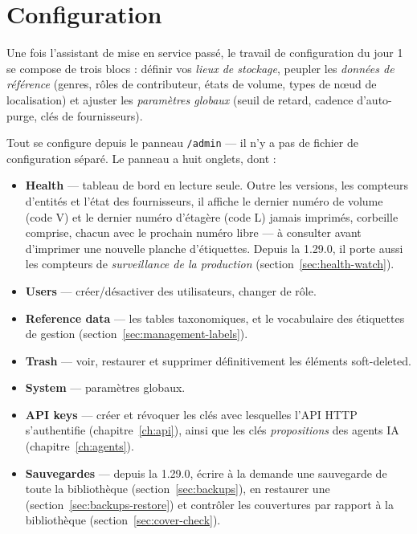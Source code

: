 \chapter{Configuration}
\label{ch:configuration}

Une fois l'assistant de mise en service passé, le travail de
configuration du jour 1 se compose de trois blocs : définir vos
\emph{lieux de stockage}, peupler les
\emph{données de référence} (genres, rôles de contributeur, états de
volume, types de nœud de localisation) et ajuster les
\emph{paramètres globaux} (seuil de retard, cadence d'auto-purge,
clés de fournisseurs).

Tout se configure depuis le panneau
\texttt{/admin} — il n'y a pas de fichier de
configuration séparé. Le panneau a huit onglets, dont :

\begin{itemize}
  \item \textbf{Health} — tableau de bord en lecture seule. Outre les
        versions, les compteurs d'entités et l'état des fournisseurs,
        il affiche le dernier numéro de volume (code V) et le dernier
        numéro d'étagère (code L) jamais imprimés, corbeille comprise,
        chacun avec le prochain numéro libre — à consulter avant
        d'imprimer une nouvelle planche d'étiquettes. Depuis la
        1.29.0, il porte aussi les compteurs de \emph{surveillance de la
        production} (section~\ref{sec:health-watch}).
  \item \textbf{Users} — créer/désactiver des utilisateurs, changer
        de rôle.
  \item \textbf{Reference data} — les tables taxonomiques, et le
        vocabulaire des étiquettes de gestion
        (section~\ref{sec:management-labels}).
  \item \textbf{Trash} — voir, restaurer et supprimer définitivement
        les éléments soft-deleted.
  \item \textbf{System} — paramètres globaux.
  \item \textbf{API keys} — créer et révoquer les clés avec
        lesquelles l'API HTTP s'authentifie (chapitre~\ref{ch:api}),
        ainsi que les clés \emph{propositions} des agents IA
        (chapitre~\ref{ch:agents}).
  \item \textbf{Sauvegardes} — depuis la 1.29.0, écrire à la demande
        une sauvegarde de toute la bibliothèque
        (section~\ref{sec:backups}), en restaurer une
        (section~\ref{sec:backups-restore}) et contrôler les couvertures
        par rapport à la bibliothèque (section~\ref{sec:cover-check}).
\end{itemize}

